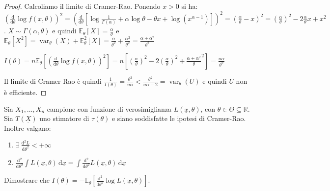 \documentclass[hidelinks, 10pt]{report}
\DeclareMathOperator{\var}{var}
\begin{document}
\begin{proof}
Calcoliamo il limite di Cramer-Rao. Ponendo $ x > 0 $ si ha:
$ \left( \frac{\mathrm{d}}{\mathrm{d} \theta} \log f(x, \theta) \right)^{2} = \left( \frac{\mathrm{d}}{\mathrm{d} \theta} \left[ \log \frac{1}{\Gamma (\alpha)} + \alpha \log \theta - \theta x + \log (x^{\alpha - 1}) \right] \right)^{2} = \left( \frac{\alpha}{\theta} - x \right)^{2} = \left( \frac{\alpha}{\theta} \right)^{2} - 2 \frac{\alpha}{\theta} x + x^{2} $. $ X \sim \Gamma (\alpha, \theta) $ e quindi $ \mathbb{E}_{\theta} [X] = \frac{\alpha}{\theta} $ e $ \mathbb{E}_{\theta} [X^{2}] = \var_{\theta} (X) + \mathbb{E}_{\theta}^{2} [X] = \frac{\alpha}{\theta^{2}} + \frac{\alpha^{2}}{\theta^{2}} = \frac{\alpha + \alpha^{2}}{\theta^{2}} $

$ I(\theta) = n \mathbb{E}_{\theta} \left[ \left( \frac{\mathrm{d}}{\mathrm{d} \theta} \log f(x, \theta) \right)^{2} \right] = n \left[ \left( \frac{\alpha}{\theta} \right)^{2} - 2 \left( \frac{\alpha}{\theta} \right)^{2} + \frac{\alpha + \alpha^{2}}{\theta}^{2} \right] = \frac{n \alpha}{\theta^{2}} $ 

Il limite di Cramer Rao \`e quindi $ \frac{1}{I (\theta)} = \frac{\theta^{2}}{n \alpha} < \frac{\theta^{2}}{n \alpha - 2} = \var_{\theta} (U) $ e quindi $ U $ non \`e efficiente.
\end{proof}
\begin{ex}
Sia $ X_{1}, \dotsc, X_{n} $ campione con funzione di verosimiglianza $ L(\underline{x}, \theta) $, con $ \theta \in \Theta \subseteq \mathbb{R} $. Sia $ T(\underline{X}) $ uno stimatore di $ \tau(\theta) $ e siano soddisfatte le ipotesi di Cramer-Rao. Inoltre valgano:
\begin{enumerate}
\item $ \exists\ \frac{\mathrm{d}^{2} L}{\mathrm{d} \theta^{2}} < +\infty $
\item $ \frac{\mathrm{d}^{2}}{\mathrm{d} \theta^{2}} \int L(\underline{x}, \theta) \, \mathrm{d}\underline{x} = \int \frac{\mathrm{d}^{2}}{\mathrm{d} \theta^{2}}  L(\underline{x}, \theta) \, \mathrm{d}\underline{x} $
\end{enumerate}

Dimostrare che $ I(\theta) = - \mathbb{E}_{\theta} \left[ \frac{\mathrm{d}^{2}}{\mathrm{d} \theta^{2}} \log L(\underline{x}, \theta) \right] $.
\end{ex}
\end{document}
